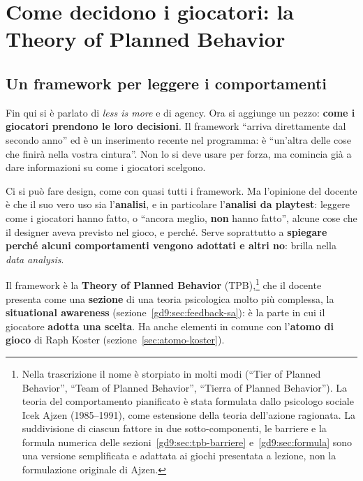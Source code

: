 \section{Come decidono i giocatori: la Theory of Planned Behavior}
\label{gd9:sec:tpb}



\subsection{Un framework per leggere i comportamenti}

Fin qui si è parlato di \emph{less is more} e di agency. Ora si aggiunge un
pezzo: \textbf{come i giocatori prendono le loro decisioni}. Il framework
``arriva direttamente dal secondo anno'' ed è un inserimento recente nel
programma: è ``un'altra delle cose che finirà nella vostra cintura''. Non lo
si deve usare per forza, ma comincia già a dare informazioni su come i
giocatori scelgono.

Ci si può fare design, come con quasi tutti i framework. Ma l'opinione del
docente è che il suo vero uso sia l'\textbf{analisi}, e in particolare
l'\textbf{analisi da playtest}: leggere come i giocatori hanno fatto, o
``ancora meglio, \textbf{non} hanno fatto'', alcune cose che il designer
aveva previsto nel gioco, e perché. Serve soprattutto a \textbf{spiegare
perché alcuni comportamenti vengono adottati e altri no}: brilla nella
\emph{data analysis}.

Il framework è la \textbf{Theory of Planned Behavior}
(TPB),\footnote{Nella trascrizione il nome è storpiato in molti modi
(``Tier of Planned Behavior'', ``Team of Planned Behavior'', ``Tierra of
Planned Behavior''). La teoria del comportamento pianificato è stata
formulata dallo psicologo sociale Icek Ajzen (1985--1991), come estensione
della teoria dell'azione ragionata. La suddivisione di ciascun fattore in due
sotto-componenti, le barriere e la formula numerica delle
sezioni~\ref{gd9:sec:tpb-barriere} e~\ref{gd9:sec:formula} sono una versione
semplificata e adattata ai giochi presentata a lezione, non la formulazione
originale di Ajzen.} che il docente presenta come una \textbf{sezione} di una
teoria psicologica molto più complessa, la \textbf{situational awareness}
(sezione~\ref{gd9:sec:feedback-sa}): è la parte in cui il giocatore
\textbf{adotta una scelta}. Ha anche elementi in comune con l'\textbf{atomo
di gioco} di Raph Koster (sezione~\ref{sec:atomo-koster}).

